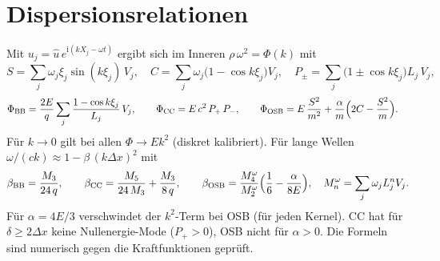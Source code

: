 \documentclass[a4paper,11pt]{article}
\begin{document}
\section*{Dispersionsrelationen}
Mit $u_j = \hat u\,e^{\mathrm i(kX_j-\omega t)}$ ergibt sich im Inneren $\rho\,\omega^2 = \Phi(k)$ mit
\[
  S = \sum_j \omega_j \xi_j \sin(k\xi_j)\,V_j,\quad C = \sum_j \omega_j\bigl(1-\cos k\xi_j\bigr)V_j ,\quad
  P_\pm = \sum_j \bigl(1\pm\cos k\xi_j\bigr)L_j\,V_j ,
\]
\begin{align*}
  \Phi_{\mathrm{BB}} &= \frac{2E}{q}\sum_j \frac{1-\cos k\xi_j}{L_j}\,V_j , \qquad
  \Phi_{\mathrm{CC}} = E\,c^2\,P_+\,P_- , \qquad
  \Phi_{\mathrm{OSB}} = E\,\frac{S^2}{m^2} + \frac{\alpha}{m}\Bigl(2C - \frac{S^2}{m}\Bigr) .
\end{align*}
Für $k\to 0$ gilt bei allen $\Phi \to E k^2$ (diskret kalibriert). Für lange Wellen
$\omega/(ck) \approx 1 - \beta\,(k\Delta x)^2$ mit
\[
  \beta_{\mathrm{BB}} = \frac{M_3}{24\,q},\qquad
  \beta_{\mathrm{CC}} = \frac{M_5}{24\,M_3} + \frac{M_3}{8\,q},\qquad
  \beta_{\mathrm{OSB}} = \frac{M^\omega_4}{M^\omega_2}\Bigl(\frac16 - \frac{\alpha}{8E}\Bigr),\quad M^\omega_n = \sum_j \omega_j L_j^n V_j .
\]
Für $\alpha = 4E/3$ verschwindet der $k^2$-Term bei OSB (für jeden Kernel).
CC hat für $\delta \ge 2\Delta x$ keine Nullenergie-Mode ($P_+ > 0$), OSB nicht für $\alpha > 0$.
Die Formeln sind numerisch gegen die Kraftfunktionen geprüft.
\end{document}
